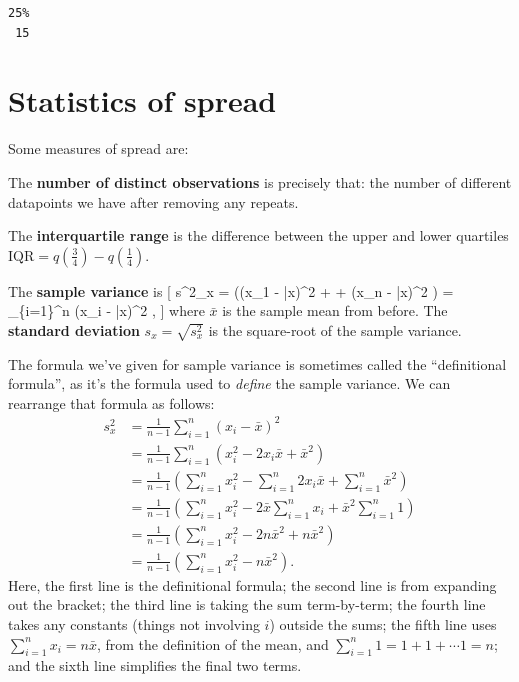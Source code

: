 \documentclass[
  letterpaper,
]{report}
\theoremstyle{definition}
\theoremstyle{definition}
\theoremstyle{remark}
\begin{document}
\begin{verbatim}
25% 
 15 
\end{verbatim}

\hypertarget{stat-spread}{%
\section{Statistics of spread}\label{stat-spread}}

Some measures of spread are:

The \textbf{number of distinct observations} is precisely that: the
number of different datapoints we have after removing any repeats.

The \textbf{interquartile range} is the difference between the upper and
lower quartiles \(\text{IQR} = q(\frac34) - q(\frac14)\).

The \textbf{sample variance} is {[} s\^{}2\_x = 
\left((x\_1 - \bar x)\^{}2 + \cdots + (x\_n - \bar x)\^{}2 \right) =
 \sum\_\{i=1\}\^{}n (x\_i - \bar x)\^{}2 , {]} where
\(\bar x\) is the sample mean from before. The \textbf{standard
deviation} \(s_x = \sqrt{s^2_x}\) is the square-root of the sample
variance.

The formula we've given for sample variance is sometimes called the
``definitional formula'', as it's the formula used to \emph{define} the
sample variance. We can rearrange that formula as follows:
\begin{align*}
  s^2_x &= \frac{1}{n-1} \sum_{i=1}^n (x_i - \bar x)^2 \\
      &= \frac{1}{n-1} \sum_{i=1}^n (x_i^2 - 2x_i\bar x + \bar x^2) \\
      &= \frac{1}{n-1}\left(\sum_{i=1}^nx_i^2 - \sum_{i=1}^n 2x_i\bar x + \sum_{i=1}^n\bar x^2 \right) \\
      &= \frac{1}{n-1} \left(\sum_{i=1}^n x_i^2 - 2\bar x \sum_{i=1}^n x_i + \bar x^2 \sum_{i=1}^n 1 \right) \\
      &= \frac{1}{n-1} \left(\sum_{i=1}^n x_i^2 - 2n\bar x^2 + n\bar x^2 \right) \\
      &= \frac{1}{n-1} \left(\sum_{i=1}^n x_i^2 -  n\bar x^2 \right) .
\end{align*} Here, the first line is the definitional formula; the
second line is from expanding out the bracket; the third line is taking
the sum term-by-term; the fourth line takes any constants (things not
involving \(i\)) outside the sums; the fifth line uses
\(\sum_{i=1}^n x_i = n\bar x\), from the definition of the mean, and
\(\sum_{i=1}^n 1 = 1 + 1 + \cdots 1 = n\); and the sixth line simplifies
the final two terms.
\end{document}
